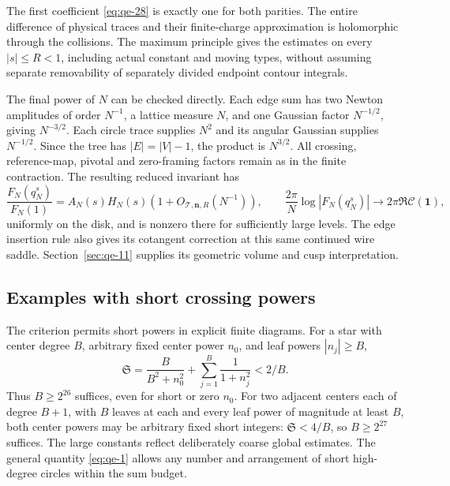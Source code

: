 The first coefficient \eqref{eq:qe-28} is exactly one for both parities. The entire difference of physical traces and their finite-charge approximation is holomorphic through the collisions. The maximum principle gives the estimates on every \(|s|\le R<1\), including actual constant and moving types, without assuming separate removability of separately divided endpoint contour integrals.

The final power of $N$ can be checked directly. Each edge sum has
two Newton amplitudes of order $N^{-1}$, a lattice measure $N$, and
one Gaussian factor $N^{-1/2}$, giving $N^{-3/2}$. Each circle
trace supplies $N^2$ and its angular Gaussian supplies $N^{-1/2}$.
Since the tree has $|E|=|V|-1$, the product is $N^{3/2}$.
All crossing, reference-map, pivotal and zero-framing factors remain
as in the finite contraction. The resulting reduced invariant has
\begin{equation}
\frac{F_N(q_N^s)}{F_N(1)}
       =A_N(s)H_N(s)(1+O_{\mathcal T,\mathbf n,R}(N^{-1})),
 \qquad
 \frac{2\pi}{N}\log|F_N(q_N^s)|
                  \longrightarrow2\pi\Re\mathcal C(\mathbf1),
\label{eq:qe-36}
\end{equation}
uniformly on the disk, and is nonzero there for sufficiently large levels. The edge insertion rule also gives its cotangent correction at this same continued wire saddle. Section~\ref{sec:qe-11} supplies its geometric volume and cusp interpretation.

\subsection{Examples with short crossing powers}\label{sec:qe-10}

The criterion permits short powers in explicit finite diagrams. For a
star with center degree \(B\), arbitrary fixed center power \(n_0\),
and leaf powers \(|n_j|\ge B\),
\begin{equation}
\mathfrak S=\frac{B}{B^2+n_0^2}
                    +\sum_{j=1}^B\frac1{1+n_j^2}<2/B.
\label{eq:qe-37}
\end{equation}
Thus \(B\ge2^{26}\) suffices, even for short or zero \(n_0\). For two adjacent centers each of degree \(B+1\), with \(B\) leaves at each and every leaf power of magnitude at least \(B\), both center powers may be arbitrary fixed short integers: \(\mathfrak S<4/B\), so \(B\ge2^{27}\) suffices. The large constants reflect deliberately coarse global estimates. The general quantity \eqref{eq:qe-1} allows any number and arrangement of short high-degree circles within the sum budget.

